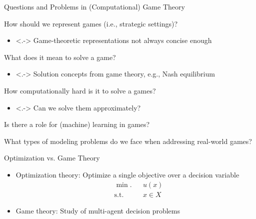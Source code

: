 \documentclass[11pt,aspectratio=169]{beamer}
\begin{document}
  \begin{frame}{Questions and Problems in (Computational) Game Theory}
   \begin{itemizes}
    \item<+-> How should we represent games (i.e., strategic settings)?
    \begin{itemize}
     \item<.-> Game-theoretic representations not always concise enough
    \end{itemize} 
	\item<+-> What does it mean to solve a game?
	\begin{itemize}
	 \item<.-> Solution concepts from game theory, e.g., Nash equilibrium
	\end{itemize}
	\item<+-> How computationally hard is it to solve a games?
	\begin{itemize}
	 \item<.-> Can we solve them approximately?
	\end{itemize}
	\item<+-> Is there a role for (machine) learning in games?
    \item<+-> What types of modeling problems do we face when addressing real-world games?
   \end{itemizes}
  \end{frame}
  
  
  
  \begin{frame}{Optimization vs. Game Theory}
   \begin{itemize}[<+->]
    \item {\color{blue}Optimization theory}: Optimize a single objective over a decision variable
    \begin{equation*}
     \begin{aligned}
      &\min.			& 	&u(x)\\
      &\text{s.t.}		&	&x \in X
     \end{aligned}
    \end{equation*}
    \item {\color{blue}Game theory}: Study of multi-agent decision problems
   \end{itemize}    
  \end{frame}
  
\end{document}
